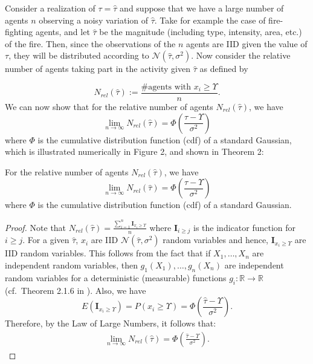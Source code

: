 \documentclass[smallextended]{svjour3}       %
\def\R{\mathbb{R}}    %
\def\td{\Upsilon}     %
\begin{document}
Consider a realization of $\tau=\hat{\tau}$ and suppose that we have a large number of agents $n$ observing a noisy variation of $\hat{\tau}$. Take for example the case of fire-fighting agents, and let $\hat{\tau}$ be the magnitude (including type, intensity, area, etc.) of the fire. Then, since the observations of the $n$ agents are IID given the value of $\tau$, they will be distributed according to $\mathcal{N}(\hat{\tau},\sigma^2)$. Now consider the relative number of agents taking part in the activity given $\hat{\tau}$ as defined by

\begin{equation*}
	N_{rel}(\hat{\tau}):=\frac{\#\text{agents with }x_i\geq \td}{n}.
\end{equation*}
We can now show that for the relative number of agents $N_{rel}(\hat{\tau})$, we have
\begin{equation}
\lim_{n\to\infty}N_{rel}(\hat{\tau})=\Phi(\frac{\hat{\tau}-\td}{\sigma^2})
\end{equation}
where $\Phi$ is the cumulative distribution function (cdf) of a standard Gaussian, which is illustrated numerically in Figure 2, and shown in Theorem 2:  

\begin{theorem}\label{thrm:relativefrequency}
For the relative number of agents $N_{rel}(\hat{\tau})$, we have
\begin{equation}
\lim_{n\to\infty}N_{rel}(\hat{\tau})=\Phi(\frac{\hat{\tau}-\td}{\sigma^2})
\end{equation}
where $\Phi$ is the cumulative distribution function (cdf) of a standard Gaussian. 
\end{theorem}
\begin{proof}
Note that $N_{rel}(\hat{\tau})=\frac{\sum_{i=1}^n\mathbf{I}_{x_i\geq \td}}{n}$ where $\mathbf{I}_{i\geq j}$ is the indicator function for $i\geq j$. For a given $\hat{\tau}$, $x_i$ are IID $\mathcal{N}(\hat{\tau},\sigma^2)$ random variables and hence, $\mathbf{I}_{x_i\geq \td}$ are IID random variables. This follows from the fact that if $X_1,\ldots,X_n$ are independent random variables, then $g_1(X_1),\ldots,g_n(X_n)$ are independent random variables for a deterministic (measurable) functions $g_i:\R\to\R$ (cf.\ Theorem 2.1.6 in \cite{durrett2010probability}). Also, we have 
\[E(\mathbf{I}_{x_i\geq \td})=P(x_i\geq \td)=\Phi(\frac{\hat{\tau}-\td}{\sigma^2}).\]
 Therefore, by the Law of Large Numbers, it follows that:
\begin{align*}
\lim_{n\to\infty}N_{rel}(\hat{\tau})=\Phi(\frac{\hat{\tau}-\td}{\sigma^2}).
\end{align*}
\end{proof}
\end{document}
